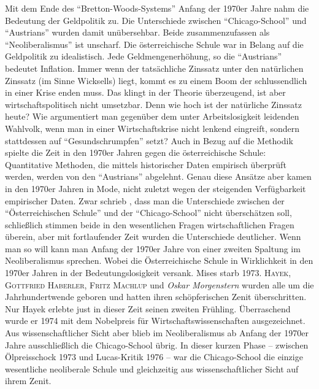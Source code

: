 Mit dem Ende des "`Bretton-Woods-Systems"' Anfang der 1970er Jahre nahm die Bedeutung der Geldpolitik zu. Die Unterschiede zwischen "`Chicago-School"' und "`Austrians"' wurden damit unübersehbar. Beide zusammenzufassen als "`Neoliberalismus"' ist unscharf. Die österreichische Schule war in Belang auf die Geldpolitik zu idealistisch. Jede Geldmengenerhöhung, so die "`Austrians"' bedeutet Inflation. Immer wenn der tatsächliche Zinssatz unter den natürlichen Zinssatz (im Sinne Wicksells) liegt, kommt es zu einem Boom der schlussendlich in einer Krise enden muss. Das klingt in der Theorie überzeugend, ist aber wirtschaftspolitisch nicht umsetzbar. Denn wie hoch ist der natürliche Zinssatz heute? Wie argumentiert man gegenüber dem unter Arbeitslosigkeit leidenden Wahlvolk, wenn man in einer Wirtschaftskrise nicht lenkend eingreift, sondern stattdessen auf "`Gesundschrumpfen"' setzt? Auch in Bezug auf die Methodik spielte die Zeit in den 1970er Jahren gegen die österreichische Schule: Quantitative Methoden, die mittels historischer Daten empirisch überprüft werden, werden von den "`Austrians"' abgelehnt. Genau diese Ansätze aber kamen in den 1970er Jahren in Mode, nicht zuletzt wegen der steigenden Verfügbarkeit empirischer Daten. 
Zwar schrieb \textcite[S. 102]{Kirzner1967}, dass man die Unterschiede zwischen der "`Österreichischen Schule"' und der "`Chicago-School"' nicht überschätzen soll, schließlich stimmen beide in den wesentlichen Fragen wirtschaftlichen Fragen überein, aber mit fortlaufender Zeit wurden die Unterschiede deutlicher. Wenn man so will kann man Anfang der 1970er Jahre von einer zweiten Spaltung im Neoliberalismus sprechen. Wobei die Österreichische Schule in Wirklichkeit in den 1970er Jahren in der Bedeutungslosigkeit versank. Mises starb 1973. \textsc{Hayek, Gottfried Haberler, Fritz Machlup} und \textit{Oskar Morgenstern} wurden alle um die Jahrhundertwende geboren und hatten ihren schöpferischen Zenit überschritten. Nur Hayek erlebte just in dieser Zeit seinen zweiten Frühling. Überraschend wurde er 1974 mit dem Nobelpreis für Wirtschaftswissenschaften ausgezeichnet. Aus wissenschaftlicher Sicht aber blieb im Neoliberalismus ab Anfang der 1970er Jahre ausschließlich die Chicago-School übrig. In dieser kurzen Phase -- zwischen Ölpreisschock 1973 und Lucas-Kritik 1976 -- war die Chicago-School die einzige wesentliche neoliberale Schule und gleichzeitig aus wissenschaftlicher Sicht auf ihrem Zenit.
